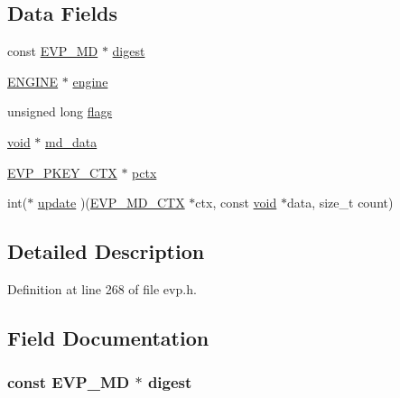 \subsection*{Data Fields}
\begin{DoxyCompactItemize}
\item 
const \hyperlink{crypto_2ossl__typ_8h_aac66cf010326fa9a927c2a34888f45d3}{E\+V\+P\+\_\+\+MD} $\ast$ \hyperlink{structenv__md__ctx__st_ad110b7eab2725b028749a3dd0c44957d}{digest}
\item 
\hyperlink{crypto_2ossl__typ_8h_abac45b251498719318e60ab8d6192510}{E\+N\+G\+I\+NE} $\ast$ \hyperlink{structenv__md__ctx__st_ae4bca26806adfdaf8a28463c98ddf03a}{engine}
\item 
unsigned long \hyperlink{structenv__md__ctx__st_a9e339c2784bd040b26a5112866700bff}{flags}
\item 
\hyperlink{hw__4758__cca_8h_afad4d591c7931ff6dc5bf69c76c96aa0}{void} $\ast$ \hyperlink{structenv__md__ctx__st_a1e7955fb36239e215771bd024a5bc78c}{md\+\_\+data}
\item 
\hyperlink{crypto_2ossl__typ_8h_aaadbb75633e4460a52864970a3b875de}{E\+V\+P\+\_\+\+P\+K\+E\+Y\+\_\+\+C\+TX} $\ast$ \hyperlink{structenv__md__ctx__st_a812f5f34c44ced23e738926fac3926a9}{pctx}
\item 
int($\ast$ \hyperlink{structenv__md__ctx__st_a72478f17745f90449c81abc3cacd1eef}{update} )(\hyperlink{crypto_2ossl__typ_8h_a69cda4d21bd068f01c469222c1dd92fe}{E\+V\+P\+\_\+\+M\+D\+\_\+\+C\+TX} $\ast$ctx, const \hyperlink{hw__4758__cca_8h_afad4d591c7931ff6dc5bf69c76c96aa0}{void} $\ast$data, size\+\_\+t count)
\end{DoxyCompactItemize}


\subsection{Detailed Description}


Definition at line 268 of file evp.\+h.



\subsection{Field Documentation}
\subsubsection[{\texorpdfstring{digest}{digest}}]{\setlength{\rightskip}{0pt plus 5cm}const {\bf E\+V\+P\+\_\+\+MD} $\ast$ digest}\hypertarget{structenv__md__ctx__st_ad110b7eab2725b028749a3dd0c44957d}{}\label{structenv__md__ctx__st_ad110b7eab2725b028749a3dd0c44957d}


